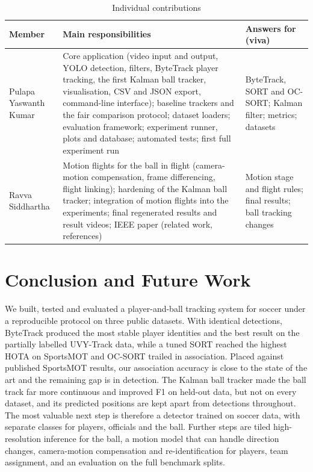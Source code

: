 \documentclass[conference]{IEEEtran}
\begin{document}
\begin{table}[!htb]
\caption{Individual contributions}
\label{tab:contrib}
\centering
\footnotesize
\begin{tabular}{@{}>{\raggedright\arraybackslash}p{1.45cm}>{\raggedright\arraybackslash}p{4.15cm}>{\raggedright\arraybackslash}p{2.25cm}@{}}
\toprule
Member & Main responsibilities & Answers for (viva) \\
\midrule
Pulapa Yaswanth Kumar & Core application (video input and output, YOLO detection, filters, ByteTrack player tracking, the first Kalman ball tracker, visualisation, CSV and JSON export, command-line interface); baseline trackers and the fair comparison protocol; dataset loaders; evaluation framework; experiment runner, plots and database; automated tests; first full experiment run & ByteTrack, SORT and OC-SORT; Kalman filter; metrics; datasets \\
Ravva Siddhartha & Motion flights for the ball in flight (camera-motion compensation, frame differencing, flight linking); hardening of the Kalman ball tracker; integration of motion flights into the experiments; final regenerated results and result videos; IEEE paper (related work, references) & Motion stage and flight rules; final results; ball tracking changes \\
\bottomrule
\end{tabular}
\end{table}


\section{Conclusion and Future Work}
We built, tested and evaluated a player-and-ball tracking system for soccer
under a reproducible protocol on three public datasets. With identical
detections, ByteTrack produced the most stable player identities and the best
result on the partially labelled UVY-Track data, while a tuned SORT reached the
highest HOTA on SportsMOT and OC-SORT trailed in association. Placed against
published SportsMOT results, our association accuracy is close to the state of
the art and the remaining gap is in detection. The Kalman ball tracker made the
ball track far more continuous and improved F1 on held-out data, but not on
every dataset, and its predicted positions are kept apart from detections
throughout. The most valuable next step is therefore a detector trained on
soccer data, with separate classes for players, officials and the ball.
Further steps are tiled high-resolution inference for the ball, a motion model
that can handle direction changes, camera-motion compensation and
re-identification for players, team assignment, and an evaluation on the full
benchmark splits.
\end{document}
